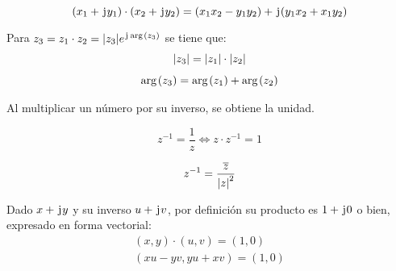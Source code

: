 \begin{mdframed}[style=DefinitionFrame]
    \begin{defn}
    \end{defn}
    \begin{equation*}
        (x_1 + \mkern2mu\mathrm{j}\mkern1mu y_1) \cdot (x_2 + \mkern2mu\mathrm{j}\mkern1mu y_2) = (x_1x_2-y_1y_2) + \mkern2mu\mathrm{j}\mkern1mu (y_1x_2+x_1y_2)
    \end{equation*}
\end{mdframed}

\begin{mdframed}[style=PropertyFrame]
    \begin{prop}
    \end{prop}
    Para $z_3=z_1 \cdot z_2 = {\left| {z_3} \right|} e^{\mkern2mu\mathrm{j}\mkern1mu \mathop{\mathrm{arg}}\mkern2mu(z_3) } $ se tiene que:
    \begin{gather*}
        {\left| {z_3} \right|} = {\left| {z_1} \right|} \cdot {\left| {z_2} \right|}
        \\[1ex]
        \mathop{\mathrm{arg}}\mkern2mu(z_3) = \mathop{\mathrm{arg}}\mkern2mu(z_1) + \mathop{\mathrm{arg}}\mkern2mu(z_2)
    \end{gather*}
\end{mdframed}

Al multiplicar un número por su inverso, se obtiene la unidad.

\begin{mdframed}[style=DefinitionFrame]
    \begin{defn}
        \label{defn:Inverse}
    \end{defn}
    \begin{equation*}
        z^{-1}=\frac{1}{z} \iff z \cdot z^{-1} = 1
    \end{equation*}
\end{mdframed}

\begin{mdframed}[style=PropertyFrame]
    \begin{prop}
    \end{prop}
    \begin{equation*}
        z^{-1}=\dfrac{\overline{z}}{{\left| {z} \right|}^2}
    \end{equation*}
\end{mdframed}


Dado $x + \mkern2mu\mathrm{j}\mkern1mu y$ y su inverso $u + \mkern2mu\mathrm{j}\mkern1mu v$, por definición su producto es $1 + \mkern2mu\mathrm{j}\mkern1mu 0$ o bien, expresado en forma vectorial:
\begin{gather*}
    (x,y) \cdot (u,v) = (1,0)
    \\
    (xu-yv,yu+xv) = (1,0)
\end{gather*}

